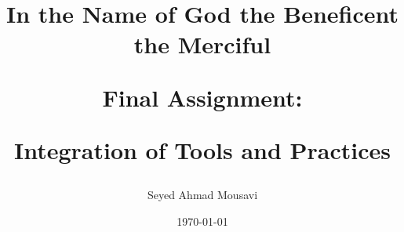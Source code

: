 \documentclass{article}
\begin{document}
\pagestyle{fancy}

\begin{titlepage}

\title{
	\textbf{In the Name of God the Beneficent the Merciful}\par
	\vspace{2in}
	\textbf{Final Assignment:}\par
	\textbf{Integration of Tools and Practices}\par
	\vspace{2in}
}
\author{Seyed Ahmad Mousavi}

\date{\today}

\maketitle
\thispagestyle{empty}

\end{titlepage}
\newpage


\tableofcontents

\fancyfoot[C]{}
\end{document}
